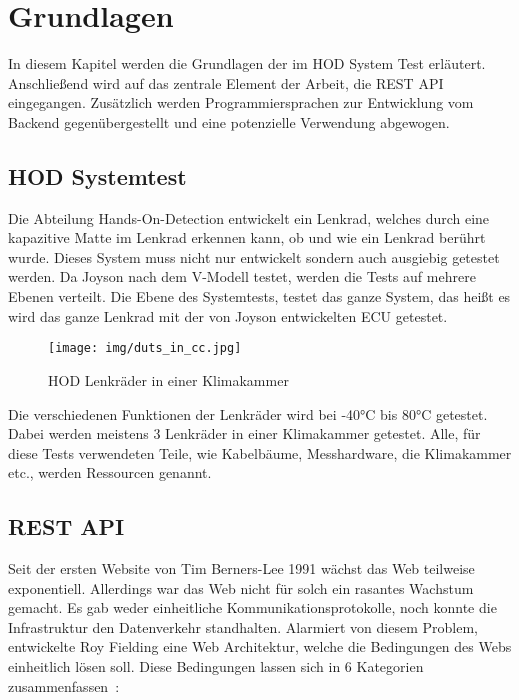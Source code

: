 \section{Grundlagen}
In diesem Kapitel werden die Grundlagen der im \gls{HOD} System Test erläutert.
Anschließend wird auf das zentrale Element der Arbeit, die REST API eingegangen.
Zusätzlich werden Programmiersprachen zur Entwicklung vom \gls{Backend} 
gegenübergestellt und eine potenzielle Verwendung abgewogen.

\subsection{HOD Systemtest}
Die Abteilung Hands-On-Detection entwickelt ein Lenkrad, welches durch eine 
kapazitive Matte im Lenkrad erkennen kann, ob und wie ein Lenkrad berührt wurde.
Dieses System muss nicht nur entwickelt sondern auch ausgiebig getestet werden.
Da Joyson nach dem V-Modell testet, werden die Tests auf mehrere Ebenen verteilt.
Die Ebene des Systemtests, testet das ganze System, das heißt es wird das ganze
Lenkrad mit der von Joyson entwickelten \gls{ECU} getestet.

\begin{figure}[H]
    \texttt{[image: img/duts\_in\_cc.jpg]}
    \centering
    \caption{HOD Lenkräder in einer Klimakammer}\label{fig:duts_in_cc}
\end{figure}

Die verschiedenen Funktionen der Lenkräder wird bei -40°C bis 80°C getestet. 
Dabei werden meistens 3 Lenkräder in einer Klimakammer getestet. Alle, für 
diese Tests verwendeten Teile, wie Kabelbäume, Messhardware, die Klimakammer etc.,
werden Ressourcen genannt.


\subsection{REST API}
Seit der ersten Website von Tim Berners-Lee 1991 wächst das Web teilweise 
exponentiell. Allerdings war das Web nicht für solch ein rasantes Wachstum gemacht.
Es gab weder einheitliche Kommunikationsprotokolle, noch konnte die Infrastruktur
den Datenverkehr standhalten. Alarmiert von diesem Problem, entwickelte Roy Fielding
eine Web Architektur, welche die Bedingungen des Webs einheitlich lösen soll.
Diese Bedingungen lassen sich in 6 Kategorien zusammenfassen~\cite{Mas11}:

